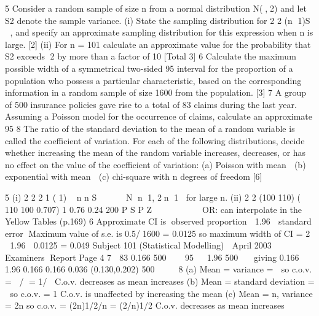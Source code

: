 
5 Consider a random sample of size n from a normal distribution N(,2) and let S2
denote the sample variance.
(i) State the sampling distribution for
2
2
(n 1)S

, and specify an approximate
sampling distribution for this expression when n is large. [2]
(ii) For n = 101 calculate an approximate value for the probability that S2 exceeds
2 by more than a factor of 10%
[Total 3]
6 Calculate the maximum possible width of a symmetrical two-sided 95%
interval for the proportion of a population who possess a particular characteristic,
based on the corresponding information in a random sample of size 1600 from the
population. [3]
7 A group of 500 insurance policies gave rise to a total of 83 claims during the last year.
Assuming a Poisson model for the occurrence of claims, calculate an approximate
95%
8 The ratio of the standard deviation to the mean of a random variable is called the
coefficient of variation.
For each of the following distributions, decide whether increasing the mean of the
random variable increases, decreases, or has no effect on the value of the coefficient
of variation:
(a) Poisson with mean 
(b) exponential with mean 
(c) chi-square with n degrees of freedom [6]


5 (i)
2
2
2 1
( 1) ~ n
n S




 N n 1, 2n 1 for large n.
(ii)
2
2
(100 110) ( 110 100 0.707) 1 0.76 0.24
200
P S P Z 
      

OR: can interpolate in the Yellow Tables (p.169)
6 Approximate CI is observed proportion  {1.96  standard error}
Maximum value of s.e. is 0.5/1600 = 0.0125
so maximum width of CI = 2  1.96  0.0125 = 0.049
Subject 101 (Statistical Modelling)  April 2003  Examiners Report
Page 4
7  83 0.166
500
  
95%
  1.96
500


giving 0.166 1.96 0.166 0.166 0.036 (0.130,0.202)
500
   
8 (a) Mean = variance =  so c.o.v. = / = 1/
C.o.v. decreases as mean increases
(b) Mean = standard deviation =  so c.o.v. = 1
C.o.v. is unaffected by increasing the mean
(c) Mean = n, variance = 2n so c.o.v. = (2n)1/2/n = (2/n)1/2
C.o.v. decreases as mean increases
